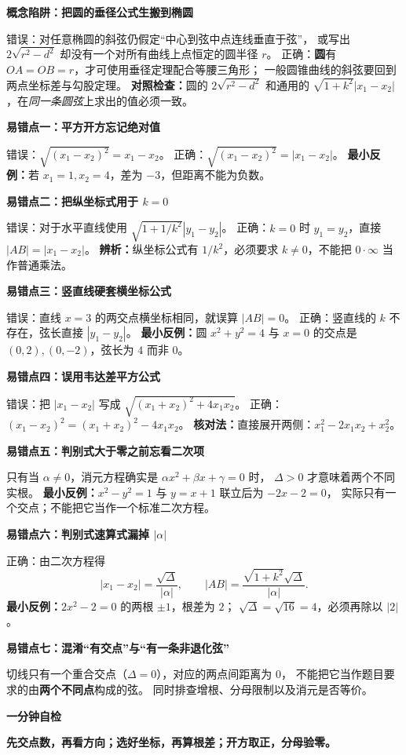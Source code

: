\begin{trapbox}
\textbf{\textcolor{CTrap}{概念陷阱：把圆的垂径公式生搬到椭圆}}



错误：对任意椭圆的斜弦仍假定“中心到弦中点连线垂直于弦”，
或写出 $2\sqrt{r^2-d^2}$ 却没有一个对所有曲线上点恒定的圆半径 $r$。
正确：\textbf{圆}有 $OA=OB=r$，才可使用垂径定理配合等腰三角形；
一般圆锥曲线的斜弦要回到两点坐标差与勾股定理。
\textbf{对照检查：}圆的 $2\sqrt{r^2-d^2}$ 和通用的
$\sqrt{1+k^2}|x_1-x_2|$，在\emph{同一条圆弦}上求出的值必须一致。

\medskip
\textbf{\textcolor{CTrap}{易错点一：平方开方忘记绝对值}}

错误：$\sqrt{(x_1-x_2)^2}=x_1-x_2$。
正确：$\boxed{\sqrt{(x_1-x_2)^2}=|x_1-x_2|}$。
\textbf{最小反例：}若 $x_1=1,x_2=4$，差为 $-3$，但距离不能为负数。

\medskip
\textbf{\textcolor{CTrap}{易错点二：把纵坐标式用于 $k=0$}}

错误：对于水平直线使用 $\sqrt{1+1/k^2}|y_1-y_2|$。
正确：$k=0$ 时 $y_1=y_2$，直接 $|AB|=|x_1-x_2|$。
\textbf{辨析：}纵坐标公式有 $1/k^2$，必须要求 $k\ne0$，不能把 $0\cdot\infty$ 当作普通乘法。

\medskip
\textbf{\textcolor{CTrap}{易错点三：竖直线硬套横坐标公式}}

错误：直线 $x=3$ 的两交点横坐标相同，就误算 $|AB|=0$。
正确：竖直线的 $k$ 不存在，弦长直接 $|y_1-y_2|$。
\textbf{最小反例：}圆 $x^2+y^2=4$ 与 $x=0$ 的交点是 $(0,2),(0,-2)$，弦长为 $4$ 而非 $0$。

\medskip
\textbf{\textcolor{CTrap}{易错点四：误用韦达差平方公式}}

错误：把 $|x_1-x_2|$ 写成 $\sqrt{(x_1+x_2)^2+4x_1x_2}$。
正确：$\boxed{(x_1-x_2)^2=(x_1+x_2)^2-4x_1x_2}$。
\textbf{核对法：}直接展开两侧：$x_1^2-2x_1x_2+x_2^2$。

\medskip
\textbf{\textcolor{CTrap}{易错点五：判别式大于零之前忘看二次项}}

只有当 $\alpha\ne0$，消元方程确实是
$\alpha x^2+\beta x+\gamma=0$ 时，
$\Delta>0$ 才意味着两个不同实根。
\textbf{最小反例：}$x^2-y^2=1$ 与 $y=x+1$ 联立后为 $-2x-2=0$，
实际只有一个交点；不能把它当作一个标准二次方程。

\medskip
\textbf{\textcolor{CTrap}{易错点六：判别式速算式漏掉 $|\alpha|$}}

正确：由二次方程得
\[
 |x_1-x_2|=\frac{\sqrt\Delta}{|\alpha|},\qquad
 |AB|=\frac{\sqrt{1+k^2}\sqrt\Delta}{|\alpha|}.
\]
\textbf{最小反例：}$2x^2-2=0$ 的两根 $\pm1$，根差为 $2$；
$\sqrt\Delta=\sqrt{16}=4$，必须再除以 $|2|$。

\medskip
\textbf{\textcolor{CTrap}{易错点七：混淆“有交点”与“有一条非退化弦”}}

切线只有一个重合交点（$\Delta=0$），对应的两点间距离为 $0$，
不能把它当作题目要求的由\textbf{两个不同点}构成的弦。
同时排查增根、分母限制以及消元是否等价。

\medskip
\textbf{\textcolor{CTrap}{一分钟自检}}

\textbf{先交点数，再看方向；选好坐标，再算根差；开方取正，分母验零。}
\end{trapbox}
